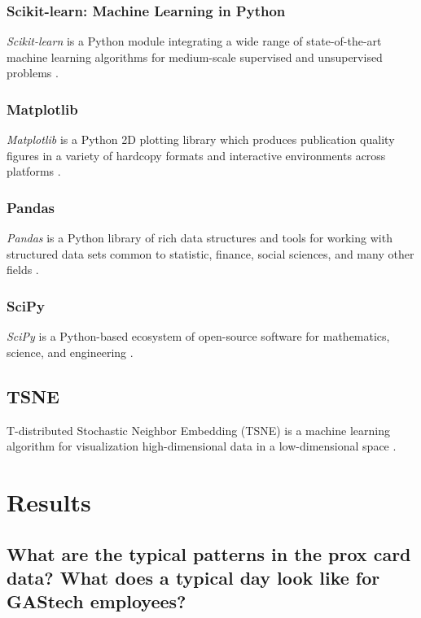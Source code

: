 \documentclass[aps, 10pt, a4paper]{article}
\begin{document}
            \subsubsection{Scikit-learn: Machine Learning in Python}
                \textit{Scikit-learn} is a Python module integrating a wide range of state-of-the-art machine learning algorithms for medium-scale supervised and unsupervised problems \cite{ref:sklearn1}.
                
            \subsubsection{Matplotlib}
                \textit{Matplotlib} is a Python 2D plotting library which produces publication quality figures in a variety of hardcopy formats and interactive environments across platforms \cite{ref:matplotlib1}.
                
            \subsubsection{Pandas}
                \textit{Pandas} is a Python library of rich data structures and tools for working with structured data sets common to statistic, finance, social sciences, and many other fields \cite{ref:pandas1}.
                
            \subsubsection{SciPy}
                \textit{SciPy} is a Python-based ecosystem of open-source software for mathematics, science, and engineering \cite{ref:scipy1}.
            
        \subsection{TSNE}
            T-distributed Stochastic Neighbor Embedding (TSNE) is a machine learning algorithm for visualization high-dimensional data in a low-dimensional space \cite{ref:tsne1}.
    
    \section{Results}
        \subsection[Question 1]{What are the typical patterns in the prox card data? What does a typical day look like for GAStech employees?}
\end{document}

